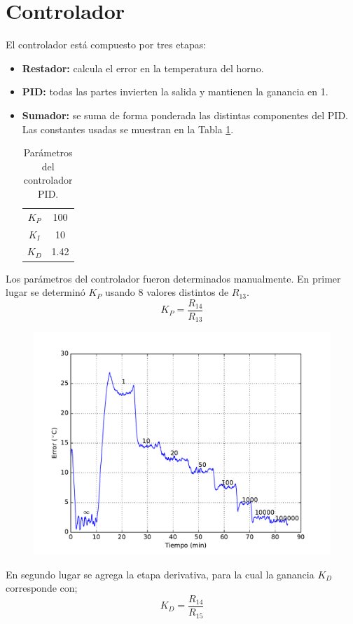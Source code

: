 \documentclass{wileysix}
\begin{document}
\section{Controlador}
El controlador est\'a compuesto por tres etapas:
\begin{itemize}
	\item \textbf{Restador:} calcula el error en la temperatura del horno.
	\item \textbf{PID:} todas las partes invierten la salida y mantienen la ganancia en 1.
	\item \textbf{Sumador:} se suma de forma ponderada las distintas componentes del PID. Las constantes usadas se muestran en la Tabla \ref{tb: PID}.
	
	\begin{table}[h]
		\centering
		\caption{Par\'ametros del controlador PID.}
		\begin{tabular}{|c|c|}
			\hline
			$K_P$ & 100 \\
			$K_I$ & 10 \\
			$K_D$ & 1.42 \\
			\hline
		\end{tabular}
		\label{tb: PID}
	\end{table}
\end{itemize}

Los par\'ametros del controlador fueron determinados manualmente. En primer lugar se determin\'o $K_P$ usando 8 valores distintos de $R_{13}$.
\begin{equation}
	K_P = \frac{R_{14}}{R_{13}}
\end{equation}

\begin{figure}[h]
	\centering
	\includegraphics[width=0.6\linewidth]{extras/KP.pdf}
\end{figure}
En segundo lugar se agrega la etapa derivativa, para la cual la ganancia $K_D$ corresponde con;
\begin{equation}
	K_D = \frac{R_{14}}{R_{15}}
\end{equation}
\end{document}
